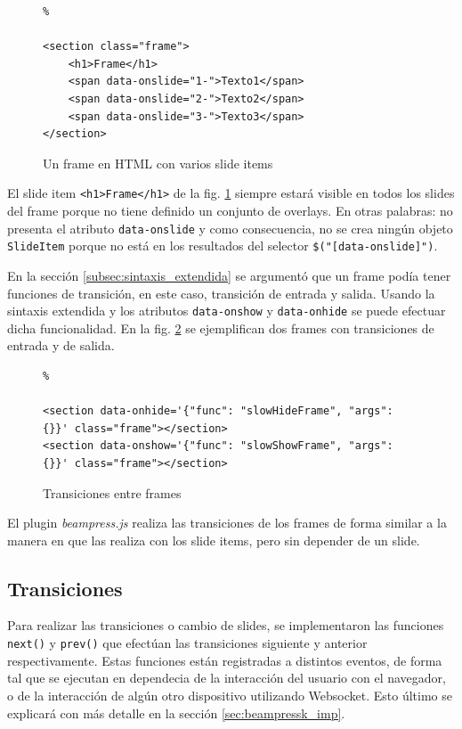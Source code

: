 			\begin{figure}[htb]%
				\begin{lstlisting}%

<section class="frame">
	<h1>Frame</h1>
	<span data-onslide="1-">Texto1</span>
	<span data-onslide="2-">Texto2</span>
	<span data-onslide="3-">Texto3</span>
</section>
				\end{lstlisting}
				\caption{Un frame en HTML con varios slide items}
				\label{fig:frame_html_slides}
			\end{figure}

			El slide item \texttt{<h1>Frame</h1>} de la fig. \ref{fig:frame_html_slides} siempre estará visible en todos los slides del frame porque no tiene definido un conjunto de overlays. En otras palabras: no presenta el atributo \texttt{data-onslide} y como consecuencia, no se crea ningún objeto \texttt{SlideItem} porque no está en los resultados del selector \texttt{\$("[data-onslide]")}.


			En la sección \ref{subsec:sintaxis_extendida} se argumentó que un frame podía tener funciones de transición, en este caso, transición de entrada y salida. Usando la sintaxis extendida y los atributos \texttt{data-onshow} y \texttt{data-onhide} se puede efectuar dicha funcionalidad. En la fig. \ref{fig:frames_transitions} se ejemplifican dos frames con transiciones de entrada y de salida.


		\begin{figure}[htb]%
			\begin{lstlisting}%

<section data-onhide='{"func": "slowHideFrame", "args": {}}' class="frame"></section>
<section data-onshow='{"func": "slowShowFrame", "args": {}}' class="frame"></section>
			\end{lstlisting}
		\caption{Transiciones entre frames}
		\label{fig:frames_transitions}
		\end{figure}	

		El plugin \textit{beampress.js} realiza las transiciones de los frames de forma similar a la manera en que las realiza con los slide items, pero sin depender de un slide.

		\subsection{Transiciones} %
		\label{sub:transiciones}
			Para realizar las transiciones o cambio de slides, se implementaron las funciones \texttt{next()} y \texttt{prev()} que efectúan las transiciones siguiente y anterior respectivamente. Estas funciones están registradas a distintos eventos, de forma tal que se ejecutan en dependecia de la interacción del usuario con el navegador, o de la interacción de algún otro dispositivo utilizando Websocket. Esto último se explicará con más detalle en la sección \ref{sec:beampressk_imp}.

